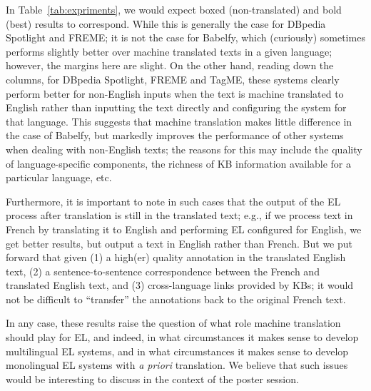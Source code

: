 \documentclass{llncs}
\begin{document}
In Table~\ref{tab:expriments}, we would expect boxed (non-translated) and bold (best) results to correspond. While this is generally the case for DBpedia Spotlight and FREME; it is not the case for Babelfy, which (curiously) sometimes performs slightly better over machine translated texts in a given language; however, the margins here are slight. On the other hand, reading down the columns, for DBpedia Spotlight, FREME and TagME, these systems clearly perform better for non-English inputs when the text is machine translated to English rather than inputting the text directly and configuring the system for that language. This suggests that machine translation makes little difference in the case of Babelfy, but markedly improves the performance of other systems when dealing with non-English texts; the reasons for this may include the quality of language-specific components, the richness of KB information available for a particular language, etc. 

Furthermore, it is important to note in such cases that the output of the EL process after translation is still in the translated text; e.g., if we process text in French by translating it to English and performing EL configured for English, we get better results, but output a text in English rather than French. But we put forward that given (1) a high(er) quality annotation in the translated English text, (2) a sentence-to-sentence correspondence between the French and translated English text, and (3) cross-language links provided by KBs; it would not be difficult to ``transfer'' the annotations back to the original French text. 

In any case, these results raise the question of what role machine translation should play for EL, and indeed, in what circumstances it makes sense to develop multilingual EL systems, and in what circumstances it makes sense to develop monolingual EL systems with \textit{a priori} translation. We believe that such issues would be interesting to discuss in the context of the poster session.

\end{document}
